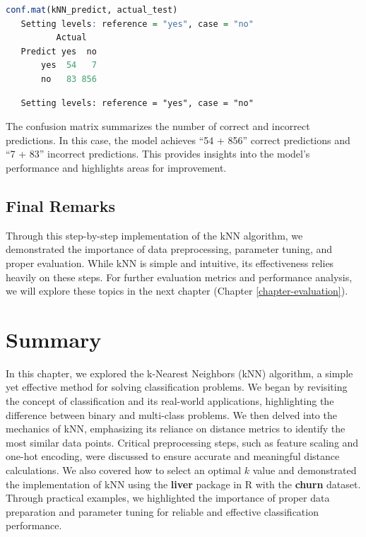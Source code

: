 \documentclass[
]{book}
\theoremstyle{definition}
\theoremstyle{definition}
\theoremstyle{definition}
\theoremstyle{definition}
\theoremstyle{remark}
\begin{document}
\begin{lstlisting}[language=R]
conf.mat(kNN_predict, actual_test)
   Setting levels: reference = "yes", case = "no"
          Actual
   Predict yes  no
       yes  54   7
       no   83 856
\end{lstlisting}

\begin{lstlisting}
   Setting levels: reference = "yes", case = "no"
\end{lstlisting}

The confusion matrix summarizes the number of correct and incorrect predictions. In this case, the model achieves ``54 + 856'' correct predictions and ``7 + 83'' incorrect predictions. This provides insights into the model's performance and highlights areas for improvement.

\subsection*{Final Remarks}\label{final-remarks}

Through this step-by-step implementation of the kNN algorithm, we demonstrated the importance of data preprocessing, parameter tuning, and proper evaluation. While kNN is simple and intuitive, its effectiveness relies heavily on these steps. For further evaluation metrics and performance analysis, we will explore these topics in the next chapter (Chapter \ref{chapter-evaluation}).

\section{Summary}\label{summary}

In this chapter, we explored the k-Nearest Neighbors (kNN) algorithm, a simple yet effective method for solving classification problems. We began by revisiting the concept of classification and its real-world applications, highlighting the difference between binary and multi-class problems. We then delved into the mechanics of kNN, emphasizing its reliance on distance metrics to identify the most similar data points. Critical preprocessing steps, such as feature scaling and one-hot encoding, were discussed to ensure accurate and meaningful distance calculations. We also covered how to select an optimal \(k\) value and demonstrated the implementation of kNN using the \textbf{liver} package in R with the \textbf{churn} dataset. Through practical examples, we highlighted the importance of proper data preparation and parameter tuning for reliable and effective classification performance.
\end{document}
